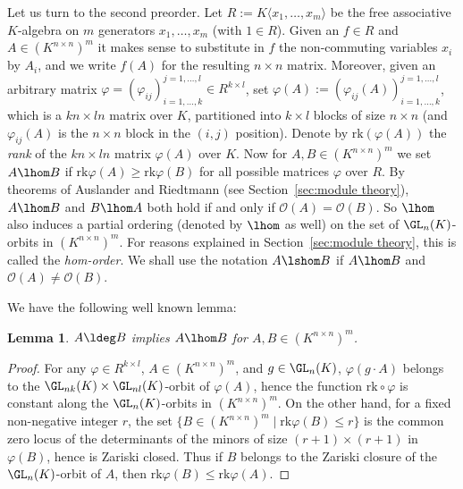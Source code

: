 \documentclass[12pt]{amsart}
\newtheorem{lemma}[theorem]{\bf Lemma}
\newcommand{\field}{K}
\newcommand{\rank}{\mathrm{rk}}
\begin{document}
Let us turn to the second preorder. Let 
$R:=\field \langle x_1,\dots,x_m\rangle$ be the free 
associative $\field$-algebra on $m$ generators $x_1,\dots,x_m$ 
(with $1\in R$). 
Given an $f\in R$ and $A\in (\field^{n\times n})^m$ 
it makes sense to substitute in $f$ the non-commuting variables $x_i$ by $A_i$, and we write 
$f(A)$ for the resulting $n\times n$ matrix. 
Moreover, given an arbitrary matrix 
$\varphi=(\varphi_{ij})_{i=1,\dots,k}^{j=1,\dots,l}\in R^{k\times l}$, 
set $\varphi(A):=(\varphi_{ij}(A))_{i=1,\dots,k}^{j=1,\dots,l}$, which is a 
$kn\times ln$ matrix over $\field$, partitioned into $k\times l$ blocks of size $n\times n$ 
(and $\varphi_{ij}(A)$ is the $n\times n$ block in the $(i,j)$ position). 
Denote by $\rank(\varphi(A))$ the \emph{rank} of the $kn\times ln$ matrix $\varphi(A)$ 
over $\field$. 
Now for $A,B\in (\field^{n\times n})^m$ we set 
$A\lhom B$ if $\rank\varphi(A)\ge \rank\varphi(B)$ 
for all possible matrices $\varphi$ over $R$. 
 By theorems of Auslander \cite{Auslander} and Riedtmann \cite{Riedtmann1} 
(see Section~\ref{sec:module theory}), 
$A\lhom B$ and $B\lhom A$ both hold if and only if 
$\mathcal{O}(A)=\mathcal{O}(B)$. So 
$\lhom$ also induces a partial ordering (denoted by $\lhom$ as well) 
on the set of $\GL_n(\field)$-orbits in $(\field^{n\times n})^m$. 
For reasons explained in Section~\ref{sec:module theory}, 
this is called the \emph{hom-order}. 
We shall use the notation $A\lshom B$ if $A\lhom B$ and 
$\mathcal{O}(A)\neq \mathcal{O}(B)$. 

We have the following well known lemma: 

\begin{lemma}\label{lemma:deg implies hom} 
$A\ldeg B$ implies $A\lhom B$ for $A,B\in (\field^{n\times n})^m$.  
\end{lemma}

\begin{proof} 
For any $\varphi\in R^{k\times l}$, $A\in (\field^{n\times n})^m$, and $g\in \GL_n(\field)$, 
$\varphi(g\cdot A)$ belongs to the $\GL_{nk}(\field)\times \GL_{nl}(\field)$-orbit of 
$\varphi(A)$, hence the function $\rank\circ \varphi$ is constant along the $\GL_n(\field)$-orbits in 
$(\field^{n\times n})^m$. On the other hand, for a fixed non-negative integer $r$, the set 
$\{B\in (\field^{n\times n})^m\mid \rank\varphi(B)\le r\}$ is the common zero locus of the determinants 
of the minors of size $(r+1)\times (r+1)$ in $\varphi(B)$, hence is Zariski closed. Thus if 
$B$ belongs to the Zariski closure of the $\GL_n(\field)$-orbit of $A$, then 
$\rank\varphi(B)\le \rank\varphi(A)$. 
\end{proof}
\end{document}
